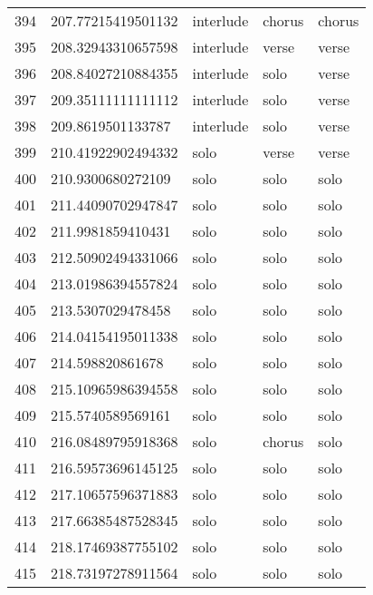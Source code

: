 \begin{table}[]
\begin{tabular}{lllll}
    394  & 207.77215419501132 & interlude    & chorus          & chorus         \\
    395  & 208.32943310657598 & interlude    & verse           & verse          \\
    396  & 208.84027210884355 & interlude    & solo            & verse          \\
    397  & 209.35111111111112 & interlude    & solo            & verse          \\
    398  & 209.8619501133787  & interlude    & solo            & verse          \\
    399  & 210.41922902494332 & solo         & verse           & verse          \\
    400  & 210.9300680272109  & solo         & solo            & solo           \\
    401  & 211.44090702947847 & solo         & solo            & solo           \\
    402  & 211.9981859410431  & solo         & solo            & solo           \\
    403  & 212.50902494331066 & solo         & solo            & solo           \\
    404  & 213.01986394557824 & solo         & solo            & solo           \\
    405  & 213.5307029478458  & solo         & solo            & solo           \\
    406  & 214.04154195011338 & solo         & solo            & solo           \\
    407  & 214.598820861678   & solo         & solo            & solo           \\
    408  & 215.10965986394558 & solo         & solo            & solo           \\
    409  & 215.5740589569161  & solo         & solo            & solo           \\
    410  & 216.08489795918368 & solo         & chorus          & solo           \\
    411  & 216.59573696145125 & solo         & solo            & solo           \\
    412  & 217.10657596371883 & solo         & solo            & solo           \\
    413  & 217.66385487528345 & solo         & solo            & solo           \\
    414  & 218.17469387755102 & solo         & solo            & solo           \\
    415  & 218.73197278911564 & solo         & solo            & solo           \\

\end{tabular}
\end{table}
